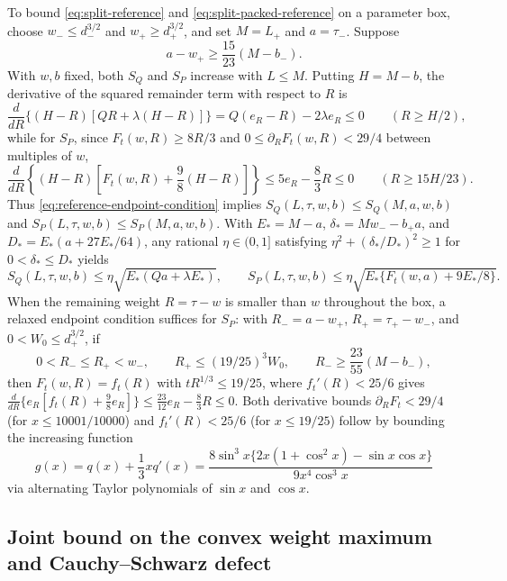 \documentclass[11pt]{article}
\numberwithin{equation}{section}
\theoremstyle{remark}
\begin{document}
To bound \eqref{eq:split-reference} and \eqref{eq:split-packed-reference} on
a parameter box, choose $w_-\le d_-^{3/2}$ and $w_+\ge d_+^{3/2}$, and set
$M=L_+$ and $a=\tau_-$. Suppose
\begin{equation}\label{eq:reference-endpoint-condition}
             a-w_+\ge\frac{15}{23}(M-b_-).
\end{equation}
With $w,b$ fixed, both $S_Q$ and $S_P$ increase with $L\le M$. Putting
$H=M-b$, the derivative of the squared remainder term with respect to $R$ is
\[
 \frac{d}{dR}\{(H-R)[QR+\lambda(H-R)]\}
       =Q(e_R-R)-2\lambda e_R\le0\qquad(R\ge H/2),
\]
while for $S_P$, since $F_t(w,R)\ge8R/3$ and $0\le\partial_R F_t(w,R)<29/4$
between multiples of $w$,
\[
 \frac{d}{dR}\left\{(H-R)\left[F_t(w,R)+\frac98(H-R)\right]\right\}
       \le5e_R-\frac83R\le0\qquad(R\ge15H/23).
\]
Thus \eqref{eq:reference-endpoint-condition} implies
$S_Q(L,\tau,w,b)\le S_Q(M,a,w,b)$ and $S_P(L,\tau,w,b)\le S_P(M,a,w,b)$.
With $E_*=M-a$, $\delta_*=Mw_--b_+a$, and $D_*=E_*(a+27E_*/64)$, any
rational $\eta\in(0,1]$ satisfying $\eta^2+(\delta_*/D_*)^2\ge1$ for
$0<\delta_*\le D_*$ yields
\[
 S_Q(L,\tau,w,b)\le\eta\sqrt{E_*(Qa+\lambda E_*)},\qquad
 S_P(L,\tau,w,b)\le\eta\sqrt{E_*\{F_t(w,a)+9E_*/8\}}.
\]
When the remaining weight $R=\tau-w$ is smaller than $w$ throughout the box,
a relaxed endpoint condition suffices for $S_P$: with $R_-=a-w_+$,
$R_+=\tau_+-w_-$, and $0<W_0\le d_+^{3/2}$, if
\begin{equation}\label{eq:single-remainder-condition}
 0<R_-\le R_+<w_-,\qquad
 R_+\le(19/25)^3W_0,\qquad
 R_-\ge\frac{23}{55}(M-b_-),
\end{equation}
then $F_t(w,R)=f_t(R)$ with $tR^{1/3}\le19/25$, where $f_t'(R)<25/6$ gives
$\frac{d}{dR}\{e_R[f_t(R)+\frac98e_R]\}\le\frac{23}{12}e_R-\frac83R\le0$.
Both derivative bounds $\partial_R F_t<29/4$ (for $x\le10001/10000$) and
$f_t'(R)<25/6$ (for $x\le19/25$) follow by bounding the increasing function
\[
 g(x)=q(x)+\frac13xq'(x)
 =\frac{8\sin^3x\{2x(1+\cos^2x)-\sin x\cos x\}}{9x^4\cos^3x}
\]
via alternating Taylor polynomials of $\sin x$ and $\cos x$.

\subsection{Joint bound on the convex weight maximum and Cauchy--Schwarz defect}
\label{sec:weight-loss}
\end{document}
